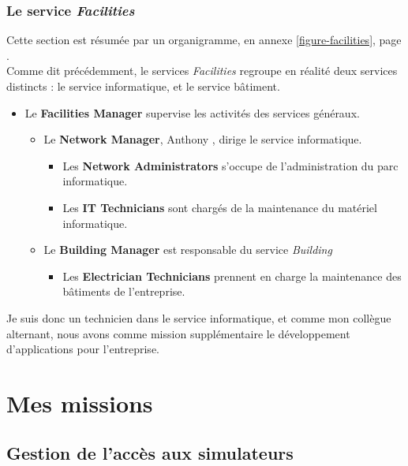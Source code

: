 \documentclass[a4paper,french,11pt,openany,oneside]{memoir}
\begin{document}
\section{Le service \emph{Facilities}}

Cette section est résumée par un organigramme, en annexe \ref{figure-facilities}, page \pageref{figure-facilities}. \\

Comme dit précédemment, le services \emph{Facilities} regroupe en réalité deux services distincts : le service informatique, et le service bâtiment. \\

\begin{itemize}
	\item Le \textbf{Facilities Manager} supervise les activités des services généraux.
	\begin{itemize}
		\item Le \textbf{Network Manager}, Anthony , dirige le service informatique.
		\begin{itemize}
			\item Les \textbf{Network Administrators} s'occupe de l'administration du parc informatique.
			\item Les \textbf{IT Technicians} sont chargés de la maintenance du matériel informatique.
		\end{itemize}
		
		\item Le \textbf{Building Manager} est responsable du service \emph{Building}
		\begin{itemize}
			\item Les \textbf{Electrician Technicians} prennent en charge la maintenance des bâtiments de l'entreprise.
		\end{itemize}
	\end{itemize}
\end{itemize}

Je suis donc un technicien dans le service informatique, et comme mon collègue alternant, nous avons comme mission supplémentaire le développement d'applications pour l'entreprise.


\part{Mes missions}

\chapter{Gestion de l'accès aux simulateurs}
\end{document}
